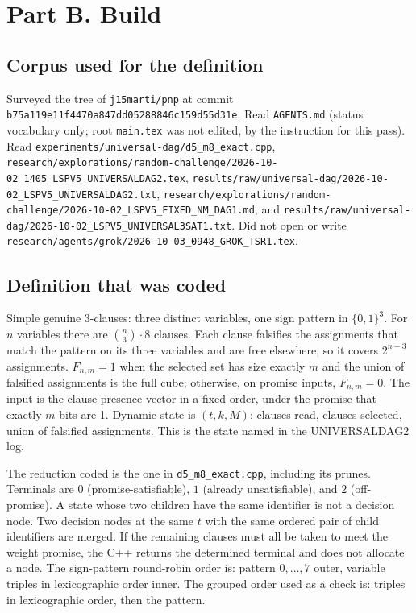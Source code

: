 \documentclass[11pt]{article}
\begin{document}
\section{Part B. Build}

\subsection*{Corpus used for the definition}
Surveyed the tree of \texttt{j15marti/pnp} at commit \texttt{b75a119e11f4470a847dd05288846c159d55d31e}.
Read \texttt{AGENTS.md} (status vocabulary only; root \texttt{main.tex} was not edited, by the instruction for this pass).
Read \texttt{experiments/universal-dag/d5\_m8\_exact.cpp}, \texttt{research/explorations/random-challenge/2026-10-02\_1405\_LSPV5\_UNIVERSALDAG2.tex}, \texttt{results/raw/universal-dag/2026-10-02\_LSPV5\_UNIVERSALDAG2.txt}, \texttt{research/explorations/random-challenge/2026-10-02\_LSPV5\_FIXED\_NM\_DAG1.md}, and \texttt{results/raw/universal-dag/2026-10-02\_LSPV5\_UNIVERSAL3SAT1.txt}.
Did not open or write \texttt{research/agents/grok/2026-10-03\_0948\_GROK\_TSR1.tex}.

\subsection*{Definition that was coded}
Simple genuine 3-clauses: three distinct variables, one sign pattern in \(\{0,1\}^3\).
For \(n\) variables there are \(\binom{n}{3}\cdot 8\) clauses.
Each clause falsifies the assignments that match the pattern on its three variables and are free elsewhere, so it covers \(2^{n-3}\) assignments.
\(F_{n,m}=1\) when the selected set has size exactly \(m\) and the union of falsified assignments is the full cube; otherwise, on promise inputs, \(F_{n,m}=0\).
The input is the clause-presence vector in a fixed order, under the promise that exactly \(m\) bits are 1.
Dynamic state is \((t,k,M)\): clauses read, clauses selected, union of falsified assignments.
This is the state named in the UNIVERSALDAG2 log.

The reduction coded is the one in \texttt{d5\_m8\_exact.cpp}, including its prunes.
Terminals are \(0\) (promise-satisfiable), \(1\) (already unsatisfiable), and \(2\) (off-promise).
A state whose two children have the same identifier is not a decision node.
Two decision nodes at the same \(t\) with the same ordered pair of child identifiers are merged.
If the remaining clauses must all be taken to meet the weight promise, the C++ returns the determined terminal and does not allocate a node.
The sign-pattern round-robin order is: pattern \(0,\ldots,7\) outer, variable triples in lexicographic order inner.
The grouped order used as a check is: triples in lexicographic order, then the pattern.
\end{document}
